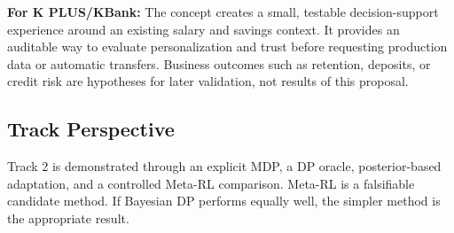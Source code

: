 \textbf{For K PLUS/KBank:} The concept creates a small, testable decision-support experience around an existing salary and savings context. It provides an auditable way to evaluate personalization and trust before requesting production data or automatic transfers. Business outcomes such as retention, deposits, or credit risk are hypotheses for later validation, not results of this proposal.

\subsection{Track Perspective}
Track 2 is demonstrated through an explicit MDP, a DP oracle, posterior-based adaptation, and a controlled Meta-RL comparison. Meta-RL is a falsifiable candidate method. If Bayesian DP performs equally well, the simpler method is the appropriate result.
